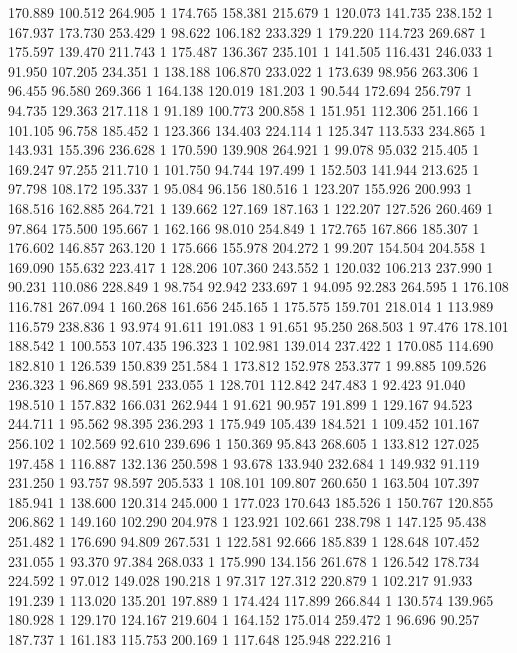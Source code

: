 	170.889	100.512	264.905	1
	174.765	158.381	215.679	1
	120.073	141.735	238.152	1
	167.937	173.730	253.429	1
	98.622	106.182	233.329	1
	179.220	114.723	269.687	1
	175.597	139.470	211.743	1
	175.487	136.367	235.101	1
	141.505	116.431	246.033	1
	91.950	107.205	234.351	1
	138.188	106.870	233.022	1
	173.639	98.956	263.306	1
	96.455	96.580	269.366	1
	164.138	120.019	181.203	1
	90.544	172.694	256.797	1
	94.735	129.363	217.118	1
	91.189	100.773	200.858	1
	151.951	112.306	251.166	1
	101.105	96.758	185.452	1
	123.366	134.403	224.114	1
	125.347	113.533	234.865	1
	143.931	155.396	236.628	1
	170.590	139.908	264.921	1
	99.078	95.032	215.405	1
	169.247	97.255	211.710	1
	101.750	94.744	197.499	1
	152.503	141.944	213.625	1
	97.798	108.172	195.337	1
	95.084	96.156	180.516	1
	123.207	155.926	200.993	1
	168.516	162.885	264.721	1
	139.662	127.169	187.163	1
	122.207	127.526	260.469	1
	97.864	175.500	195.667	1
	162.166	98.010	254.849	1
	172.765	167.866	185.307	1
	176.602	146.857	263.120	1
	175.666	155.978	204.272	1
	99.207	154.504	204.558	1
	169.090	155.632	223.417	1
	128.206	107.360	243.552	1
	120.032	106.213	237.990	1
	90.231	110.086	228.849	1
	98.754	92.942	233.697	1
	94.095	92.283	264.595	1
	176.108	116.781	267.094	1
	160.268	161.656	245.165	1
	175.575	159.701	218.014	1
	113.989	116.579	238.836	1
	93.974	91.611	191.083	1
	91.651	95.250	268.503	1
	97.476	178.101	188.542	1
	100.553	107.435	196.323	1
	102.981	139.014	237.422	1
	170.085	114.690	182.810	1
	126.539	150.839	251.584	1
	173.812	152.978	253.377	1
	99.885	109.526	236.323	1
	96.869	98.591	233.055	1
	128.701	112.842	247.483	1
	92.423	91.040	198.510	1
	157.832	166.031	262.944	1
	91.621	90.957	191.899	1
	129.167	94.523	244.711	1
	95.562	98.395	236.293	1
	175.949	105.439	184.521	1
	109.452	101.167	256.102	1
	102.569	92.610	239.696	1
	150.369	95.843	268.605	1
	133.812	127.025	197.458	1
	116.887	132.136	250.598	1
	93.678	133.940	232.684	1
	149.932	91.119	231.250	1
	93.757	98.597	205.533	1
	108.101	109.807	260.650	1
	163.504	107.397	185.941	1
	138.600	120.314	245.000	1
	177.023	170.643	185.526	1
	150.767	120.855	206.862	1
	149.160	102.290	204.978	1
	123.921	102.661	238.798	1
	147.125	95.438	251.482	1
	176.690	94.809	267.531	1
	122.581	92.666	185.839	1
	128.648	107.452	231.055	1
	93.370	97.384	268.033	1
	175.990	134.156	261.678	1
	126.542	178.734	224.592	1
	97.012	149.028	190.218	1
	97.317	127.312	220.879	1
	102.217	91.933	191.239	1
	113.020	135.201	197.889	1
	174.424	117.899	266.844	1
	130.574	139.965	180.928	1
	129.170	124.167	219.604	1
	164.152	175.014	259.472	1
	96.696	90.257	187.737	1
	161.183	115.753	200.169	1
	117.648	125.948	222.216	1
